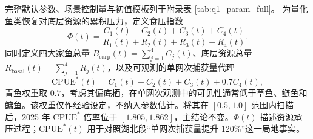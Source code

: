 完整默认参数、场景控制量与初值模板列于附录表 \ref{tab:q1_param_full}。
为量化鱼类恢复对底层资源的累积压力，定义食压指数
\begin{equation}
\Phi(t)=\frac{C_1(t)+C_2(t)+C_3(t)+C_4(t)}{R_1(t)+R_2(t)+R_3(t)+R_4(t)}.
\end{equation}
同时定义四大家鱼总量 $B_{\text{carp}}(t)=\sum_{j=1}^4 C_j(t)$、底层资源总量 $R_{\text{basal}}(t)=\sum_{j=1}^4 R_j(t)$，以及可观测的单网次捕获量代理
\begin{equation}
\mathrm{CPUE}^*(t)=C_1(t)+C_2(t)+C_3(t)+0.7C_4(t),
\end{equation}
青鱼权重取 $0.7$，考虑其偏底栖，在单网次观测中的可见性通常低于草鱼、鲢鱼和鳙鱼。该权重仅作经验设定，不纳入参数估计。将其在 $[0.5,1.0]$ 范围内扫描后，2025 年 $\mathrm{CPUE}^*$ 倍率位于 $[1.805,1.862]$，主结论不变。$\Phi(t)$ 描述资源承压过程；$\mathrm{CPUE}^*(t)$ 用于对照湖北段“单网次捕获量提升 120\%”这一局地事实\cite{maunder2004,maunder2006}。

